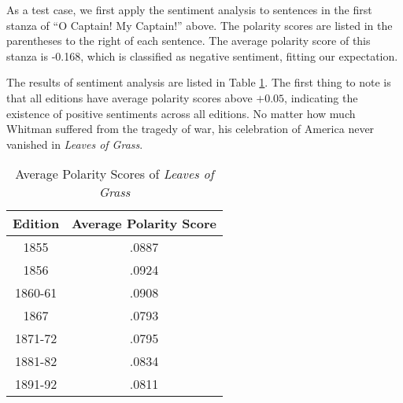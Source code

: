 \documentclass[12pt]{article}
\begin{document}
\par
As a test case, we first apply the sentiment analysis to sentences in the first stanza of ``O Captain! My Captain!'' above. The polarity scores are listed in the parentheses to the right of each sentence. The average polarity score of this stanza is -0.168, which is classified as negative sentiment, fitting our expectation.

\par
The results of sentiment analysis are listed in Table \ref{tab::sentiment}. The first thing to note is that all editions have average polarity scores above $+0.05$, indicating the existence of positive sentiments across all editions. No matter how much Whitman suffered from the tragedy of war, his celebration of America never vanished in \textit{Leaves of Grass}.
\begin{table}[h!]
\centering
\begin{tabular}{c|c}
\hline
Edition & Average Polarity Score\\
\hline
1855 & .0887 \\
\hline
1856 & .0924\\
\hline
1860-61 & .0908\\
\hline
1867 & .0793\\
\hline
1871-72 & .0795\\
\hline
1881-82 & .0834\\
\hline
1891-92 & .0811\\
\hline
\end{tabular}
\caption{Average Polarity Scores of \textit{Leaves of Grass}}
\label{tab::sentiment}
\end{table}
\end{document}
